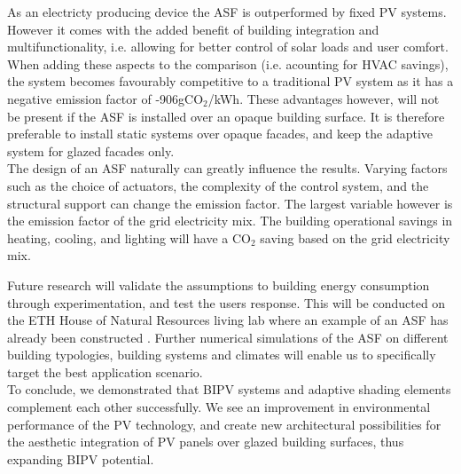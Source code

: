 

As an electricty producing device the ASF is outperformed by fixed PV systems. However it comes with the added benefit of building integration and multifunctionality, i.e. allowing for better control of solar loads and user comfort. When adding these aspects to the comparison (i.e. acounting for HVAC savings), the system becomes favourably competitive to a traditional PV system as it has a negative emission factor of -906gCO${_2}$/kWh. These advantages however, will not be present if the ASF is installed over an opaque building surface. It is therefore preferable to install static systems over opaque facades, and keep the adaptive system for glazed facades only.\\

The design of an ASF naturally can greatly influence the results. Varying factors such as the choice of actuators, the complexity of the control system, and the structural support can change the emission factor. The largest variable however is the emission factor of the grid electricity mix. The building operational savings in heating, cooling, and lighting will have a CO${_2}$ saving based on the grid electricity mix. 

Future research will validate the assumptions to building energy consumption through experimentation, and test the users response. This will be conducted on the ETH House of Natural Resources living lab where an example of an ASF has already been constructed \cite{nagy2015frontiers}. Further numerical simulations of the ASF on different building typologies, building systems and climates will enable us to specifically target the best application scenario. \\

To conclude, we demonstrated that BIPV systems and adaptive shading elements complement each other successfully. We see an improvement in environmental performance of the PV technology, and create new architectural possibilities for the aesthetic integration of PV panels over glazed building surfaces, thus expanding BIPV potential. 






